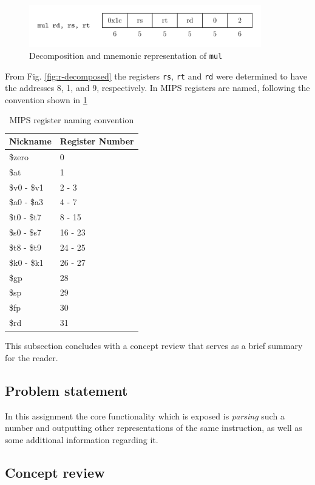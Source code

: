 \begin{figure}[H]
  \centering
  \includegraphics[width=0.9\textwidth]{figures/mul-decomposed.png}
  \caption{Decomposition and mnemonic representation of \texttt{mul}}
  \label{fig:mul-decomposed}
\end{figure}

From Fig. \ref{fig:r-decomposed} the registers \texttt{rs},
\texttt{rt} and \texttt{rd} were determined to have the addresses 8,
1, and 9, respectively. In MIPS registers are named, following the
convention shown in \ref{table:mips-register-naming-convention}

\begin{table}[H]
\centering
\caption{MIPS register naming convention}
\begin{tabular}{ll}
\toprule
Nickname & Register Number \\
\midrule
\$zero      & 0            \\
\$at        & 1            \\
\$v0 - \$v1 & 2 - 3        \\
\$a0 - \$a3 & 4 - 7        \\
\$t0 - \$t7 & 8 - 15       \\
\$s0 - \$s7 & 16 - 23      \\
\$t8 - \$t9 & 24 - 25      \\
\$k0 - \$k1 & 26 - 27      \\
\$gp        & 28           \\
\$sp        & 29           \\
\$fp        & 30           \\
\$rd        & 31           \\
\bottomrule
\end{tabular}
\label{table:mips-register-naming-convention}
\end{table}


This subsection concludes with a concept review that serves as a brief
summary for the reader.

\subsection{Problem statement}


In this assignment the core functionality which is exposed is
\emph{parsing} such a number and outputting other representations of
the same instruction, as well as some additional information regarding
it.

\subsection{Concept review}
